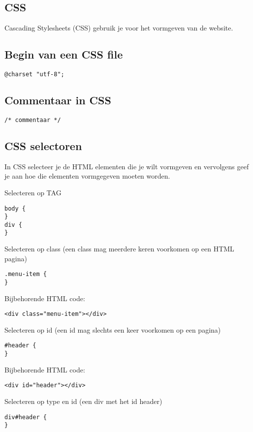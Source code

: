 \documentclass[8pt,pagesize,footinclude=false,headinclude=false]{scrartcl}
\begin{document}
\begin{multicols*}{4}
\clearpage

\section*{CSS}
Cascading Stylesheets (CSS) gebruik je voor het vormgeven van de website. 

\subsection*{Begin van een CSS file}
\begin{lstlisting}
@charset "utf-8";
\end{lstlisting}

\subsection*{Commentaar in CSS}
\begin{lstlisting}
/* commentaar */
\end{lstlisting}

\subsection*{CSS selectoren}
In CSS selecteer je de HTML elementen die je wilt vormgeven en vervolgens geef je aan hoe die elementen vormgegeven moeten worden.

\noindent Selecteren op TAG
\begin{lstlisting}
body {
}
div {
}
\end{lstlisting}

\noindent Selecteren op class (een class mag meerdere keren voorkomen op een HTML pagina)
\begin{lstlisting}
.menu-item {
}
\end{lstlisting}
\noindent Bijbehorende HTML code:
\begin{lstlisting}
<div class="menu-item"></div>
\end{lstlisting}

\noindent Selecteren op id (een id mag slechts een keer voorkomen op een pagina)
\begin{lstlisting}
#header {
}
\end{lstlisting}
\noindent Bijbehorende HTML code:
\begin{lstlisting}
<div id="header"></div>
\end{lstlisting}

\noindent Selecteren op type en id (een div met het id header)
\begin{lstlisting}
div#header {
}
\end{lstlisting}


\end{multicols*}
\end{document}
